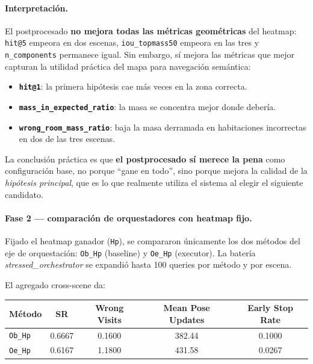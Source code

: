 \documentclass[11pt,a4paper]{article}
\begin{document}
\paragraph{Interpretación.} El postprocesado \textbf{no mejora todas las
métricas geométricas} del heatmap: \texttt{hit@5} empeora en dos escenas,
\texttt{iou\_topmass50} empeora en las tres y \texttt{n\_components} permanece
igual. Sin embargo, sí mejora las métricas que mejor capturan la utilidad
práctica del mapa para navegación semántica:
\begin{itemize}
  \item \textbf{\texttt{hit@1}}: la primera hipótesis cae más veces en la zona
        correcta.
  \item \textbf{\texttt{mass\_in\_expected\_ratio}}: la masa se concentra mejor
        donde debería.
  \item \textbf{\texttt{wrong\_room\_mass\_ratio}}: baja la masa derramada en
        habitaciones incorrectas en dos de las tres escenas.
\end{itemize}
La conclusión práctica es que \textbf{el postprocesado sí merece la pena} como
configuración base, no porque ``gane en todo'', sino porque mejora la calidad
de la \emph{hipótesis principal}, que es lo que realmente utiliza el sistema al
elegir el siguiente candidato.

\paragraph{Fase 2 --- comparación de orquestadores con heatmap fijo.} Fijado el
heatmap ganador (\texttt{Hp}), se compararon únicamente los dos métodos del eje
de orquestación: \texttt{Ob\_Hp} (baseline) y \texttt{Oe\_Hp} (executor). La
batería \emph{stressed\_orchestrator} se expandió hasta 100 queries por método
y por escena.

El agregado cross-scene da:
\begin{center}
\begin{tabular}{lcccc}
\toprule
\textbf{Método} & \textbf{SR} & \textbf{Wrong Visits} &
\textbf{Mean Pose Updates} & \textbf{Early Stop Rate} \\
\midrule
\texttt{Ob\_Hp} & 0.6667 & 0.1600 & 382.44 & 0.1000 \\
\texttt{Oe\_Hp} & 0.6167 & 1.1800 & 431.58 & 0.0267 \\
\bottomrule
\end{tabular}
\end{center}
\end{document}

